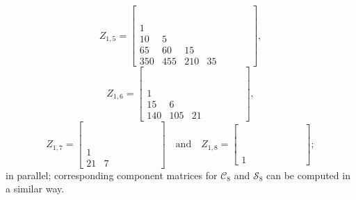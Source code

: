 \begin{example}
\begin{displaymath}
\end{displaymath}
\begin{displaymath}
Z_{1,5} = \left[\begin{matrix} &  &  &  &  &  &  & \\ &  &  &  &  &  &  & \\ &  &  &  &  &  &  & \\ &  &  &  &  &  &  & \\1 &  &  &  &  &  &  & \\10 & 5 &  &  &  &  &  & \\65 & 60 & 15 &  &  &  &  & \\350 & 455 & 210 & 35 &  &  &  & \end{matrix}\right],
\end{displaymath}
\begin{displaymath}
Z_{1,6} = \left[\begin{matrix} &  &  &  &  &  &  & \\ &  &  &  &  &  &  & \\ &  &  &  &  &  &  & \\ &  &  &  &  &  &  & \\ &  &  &  &  &  &  & \\1 &  &  &  &  &  &  & \\15 & 6 &  &  &  &  &  & \\140 & 105 & 21 &  &  &  &  & \end{matrix}\right],
\end{displaymath}
\begin{displaymath}
Z_{1,7} = \left[\begin{matrix} &  &  &  &  &  &  & \\ &  &  &  &  &  &  & \\ &  &  &  &  &  &  & \\ &  &  &  &  &  &  & \\ &  &  &  &  &  &  & \\ &  &  &  &  &  &  & \\1 &  &  &  &  &  &  & \\21 & 7 &  &  &  &  &  & \end{matrix}\right]
\quad\text{and}\quad Z_{1,8} = \left[\begin{matrix} &  &  &  &  &  &  & \\ &  &  &  &  &  &  & \\ &  &  &  &  &  &  & \\ &  &  &  &  &  &  & \\ &  &  &  &  &  &  & \\ &  &  &  &  &  &  & \\ &  &  &  &  &  &  & \\1 &  &  &  &  &  &  & \end{matrix}\right];
\end{displaymath}
in parallel; corresponding component matrices for $\mathcal{C}_{8}$ and
$\mathcal{S}_{8}$ can be computed in a similar way.
\end{example}

